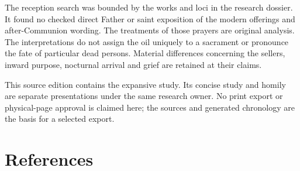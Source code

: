 The reception search was bounded by the works and loci in the research dossier. It found no checked direct Father or saint exposition of the modern offerings and after-Communion wording. The treatments of those prayers are original analysis. The interpretations do not assign the oil uniquely to a sacrament or pronounce the fate of particular dead persons. Material differences concerning the sellers, inward purpose, nocturnal arrival and grief are retained at their claims.

This source edition contains the expansive study. Its concise study and homily are separate presentations under the same research owner. No print export or physical-page approval is claimed here; the sources and generated chronology are the basis for a selected export.

\section{References}
